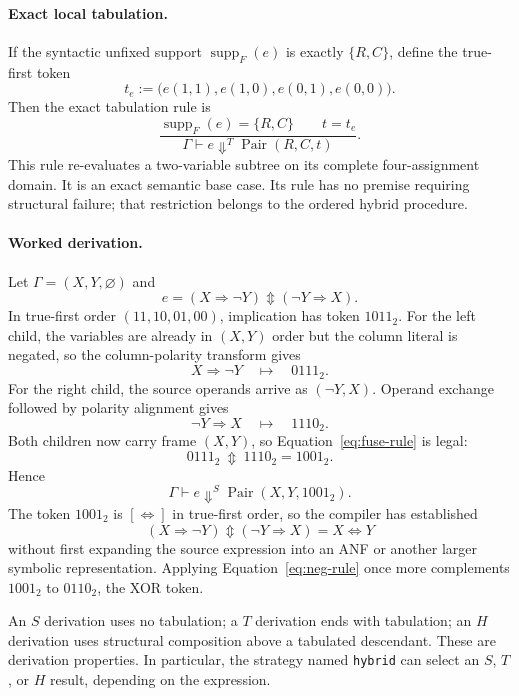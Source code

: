 \documentclass[10pt]{article}
\newcommand{\bxor}{\mathbin{\Updownarrow}}
\newcommand{\Pair}{\operatorname{Pair}}
\newcommand{\supp}{\operatorname{supp}}
\theoremstyle{plain}
\theoremstyle{definition}
\theoremstyle{remark}
\begin{document}
\paragraph{Exact local tabulation.}
If the syntactic unfixed support $\supp_F(e)$ is exactly $\{R,C\}$, define the true-first token
\begin{equation}
 t_e:=\bigl(e(1,1),e(1,0),e(0,1),e(0,0)\bigr).
 \label{eq:tab-token}
\end{equation}
Then the exact tabulation rule is
\[
\frac{
  \supp_F(e)=\{R,C\}
  \qquad t=t_e
}{
  \Gamma\vdash e\Downarrow^T\Pair(R,C,t)
}.
\]
This rule re-evaluates a two-variable subtree on its complete four-assignment domain. It is an exact semantic base case. Its rule has no premise requiring structural failure; that restriction belongs to the ordered hybrid procedure.

\paragraph{Worked derivation.}
Let $\Gamma=(X,Y,\varnothing)$ and
\begin{equation}
 e=(X\Rightarrow\neg Y)\bxor(\neg Y\Rightarrow X).
 \label{eq:worked-expression}
\end{equation}
In true-first order $(11,10,01,00)$, implication has token $1011_2$. For the left child, the variables are already in $(X,Y)$ order but the column literal is negated, so the column-polarity transform gives
\[
 X\Rightarrow\neg Y\quad\longmapsto\quad 0111_2.
\]
For the right child, the source operands arrive as $(\neg Y,X)$. Operand exchange followed by polarity alignment gives
\[
 \neg Y\Rightarrow X\quad\longmapsto\quad 1110_2.
\]
Both children now carry frame $(X,Y)$, so Equation~\eqref{eq:fuse-rule} is legal:
\begin{equation}
 0111_2\ \bxor\ 1110_2=1001_2.
 \label{eq:worked-fusion}
\end{equation}
Hence
\[
 \Gamma\vdash e\Downarrow^S\Pair(X,Y,1001_2).
\]
The token $1001_2$ is $[\Leftrightarrow]$ in true-first order, so the compiler has established
\[
 (X\Rightarrow\neg Y)\bxor(\neg Y\Rightarrow X)=X\Leftrightarrow Y
\]
without first expanding the source expression into an ANF or another larger symbolic representation. Applying Equation~\eqref{eq:neg-rule} once more complements $1001_2$ to $0110_2$, the XOR token.

An $S$ derivation uses no tabulation; a $T$ derivation ends with tabulation; an $H$ derivation uses structural composition above a tabulated descendant. These are derivation properties. In particular, the strategy named \texttt{hybrid} can select an $S$, $T$, or $H$ result, depending on the expression.
\end{document}
